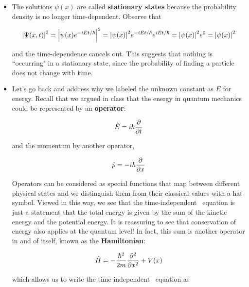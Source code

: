 \begin{itemize}
	\item The solutions $\psi(x)$ are called \textbf{stationary states} because the probability density is no longer time-dependent. 
	Observe that 
	
	\begin{equation*}
		\abs{\Psi(x,t)}^2 = \abs{\psi(x)e^{-iEt/\hbar}}^2 = \abs{\psi(x)}^2e^{-iEt/\hbar}e^{iEt/\hbar} = \abs{\psi(x)}^2e^0 = \abs{\psi(x)}^2
	\end{equation*}

	and the time-dependence cancels out. 
	This suggests that nothing is ``occurring" in a stationary state, since the probability of finding a particle does not change with time.
	
	\item Let's go back and address why we labeled the unknown constant as $E$ for energy. 
	Recall that we argued in class that the energy in quantum mechanics could be represented by an \textbf{operator}: 
	
	\begin{equation}
		\hat{E} = i\hbar\pdv{t} \label{eq:Eop}
	\end{equation}
	
	and the momentum by another operator,
	
	\begin{equation}
		\hat{p} = -i\hbar\pdv{x} \label{eq:Pop}
	\end{equation}
	
	Operators can be considered as special functions that map between different physical states and we distinguish them from their classical values with a hat symbol. 
	Viewed in this way, we see that the time-independent \Sch\ equation is just a statement that the total energy is given by the sum of the kinetic energy and the potential energy. 
	It is reassuring to see that conservation of energy also applies at the quantum level! 
	In fact, this sum is another operator in and of itself, known as the \textbf{Hamiltonian}:
	
	\begin{tcolorbox}[title = Hamiltonian operator] \vspace{-2ex}
		\begin{equation}
		\hat{H} = -\frac{\hbar^2}{2m}\pdv[2]{x}+V(x) \label{eq:ham}
		\end{equation}
	\end{tcolorbox}

	which allows us to write the time-independent \Sch\ equation as
	

\end{itemize}
